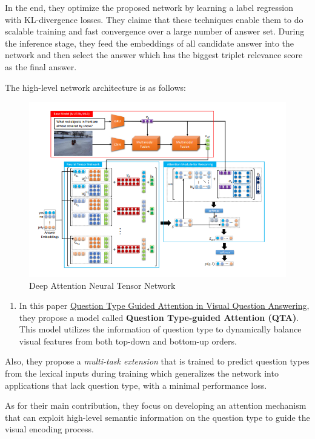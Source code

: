 \documentclass[]{book}
\providecommand{\tightlist}{%
  \setlength{\itemsep}{0pt}\setlength{\parskip}{0pt}}
\theoremstyle{definition}
\theoremstyle{definition}
\theoremstyle{definition}
\theoremstyle{remark}
\begin{document}
In the end, they optimize the proposed network by learning a label
regression with KL-divergence losses. They claime that these techniques
enable them to do scalable training and fast convergence over a large
number of answer set. During the inference stage, they feed the
embeddings of all candidate answer into the network and then select the
answer which has the biggest triplet relevance score as the final
answer.

The high-level network architecture is as follows:

\begin{figure}
\centering
\includegraphics{img/vqa.png}
\caption{Deep Attention Neural Tensor Network}
\end{figure}

\begin{enumerate}
\def\labelenumi{\arabic{enumi}.}
\setcounter{enumi}{1}
\tightlist
\item
  In this paper \href{https://arxiv.org/pdf/1804.02088.pdf}{Question
  Type Guided Attention in Visual Question Answering}, they propose a
  model called \textbf{Question Type-guided Attention (QTA)}. This model
  utilizes the information of question type to dynamically balance
  visual features from both top-down and bottom-up orders.
\end{enumerate}

Also, they propose a \emph{multi-task extension} that is trained to
predict question types from the lexical inputs during training which
generalizes the network into applications that lack question type, with
a minimal performance loss.

As for their main contribution, they focus on developing an attention
mechanism that can exploit high-level semantic information on the
question type to guide the visual encoding process.
\end{document}
